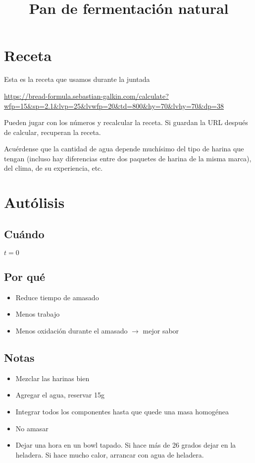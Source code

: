 \documentclass[10pt,a4paper]{article}
\title{Pan de fermentación natural}
\begin{document}
\maketitle
\tableofcontents

\section{Receta}
Esta es la receta que usamos durante la juntada

\url{https://bread-formula.sebastian-galkin.com/calculate?wfp=15&sp=2.1&lvp=25&lvwfp=20&td=800&hy=70&lvhy=70&dp=38}

Pueden jugar con los números y recalcular la receta.  Si guardan la URL
después de calcular, recuperan la receta.

Acuérdense que la cantidad de agua depende muchísimo del tipo de harina que
tengan (incluso hay diferencias entre dos paquetes de harina de la misma marca),
del clima, de su experiencia, etc.
\section{Autólisis}
\subsection*{Cuándo}
  $t=0$
\subsection*{Por qué}
  \begin{itemize}
    \item Reduce tiempo de amasado
    \item Menos trabajo
    \item Menos oxidación durante el amasado $\rightarrow$ mejor sabor
  \end{itemize}
\subsection*{Notas}
  \begin{itemize}
    \item Mezclar las harinas bien
    \item Agregar el agua, reservar 15g
    \item Integrar todos los componentes hasta que quede una masa homogénea
    \item No amasar
    \item Dejar una hora en un bowl tapado. Si hace más de 26 grados dejar en la
      heladera. Si hace mucho calor, arrancar con agua de heladera.
  \end{itemize}
\end{document}
